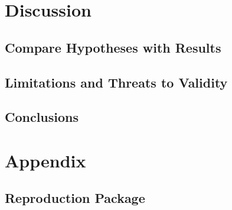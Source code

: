 \documentclass[unicode,11pt,a4paper,oneside,numbers=endperiod,openany]{scrartcl}
\begin{document}
\section{Discussion}

\subsection{Compare Hypotheses with Results}


\subsection{Limitations and Threats to Validity}


\subsection{Conclusions}




\section{Appendix}

\subsection{Reproduction Package}
\end{document}
